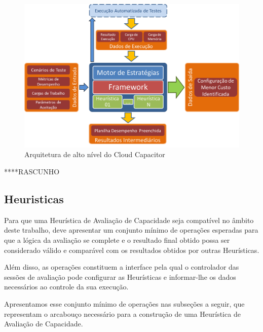 \begin{figure}[htb]
  \caption{\label{fig_arq_alto_nivel}Arquitetura de alto nível do Cloud Capacitor}
  \begin{center}
    \includegraphics[scale=0.5]{img/arquiteturaAltoNivel}
  \end{center}
\end{figure}

****RASCUNHO
\subsection{Heuristicas}
Para que uma Heurística de Avaliação de Capacidade seja compatível no âmbito deste trabalho, 
deve apresentar um conjunto mínimo de operações esperadas para que a lógica da
avaliação se complete e o resultado final obtido possa ser considerado válido e
comparável com os resultados obtidos por outras Heurísticas.

Além disso, as operações constituem a interface pela qual o controlador das 
sessões de avaliação pode configurar as Heurísticas e informar-lhe os dados 
necessários ao controle da sua execução.
 
Apresentamos esse conjunto mínimo de operações nas subseções a seguir, que 
representam o arcabouço necessário para a construção de uma Heurística de 
Avaliação de Capacidade.
 
